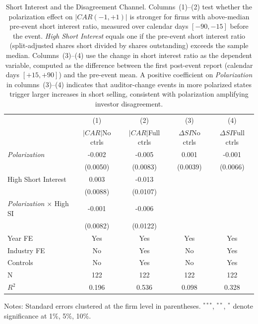 \begin{table}[htbp]
\centering
\caption{Short Interest and the Disagreement Channel. Columns~(1)--(2) test whether the polarization effect on $|CAR(-1,+1)|$ is stronger for firms with above-median pre-event short interest ratio, measured over calendar days $[-90,-15]$ before the event. \textit{High Short Interest} equals one if the pre-event short interest ratio (split-adjusted shares short divided by shares outstanding) exceeds the sample median. Columns~(3)--(4) use the change in short interest ratio as the dependent variable, computed as the difference between the first post-event report (calendar days $[+15,+90]$) and the pre-event mean. A positive coefficient on \textit{Polarization} in columns~(3)--(4) indicates that auditor-change events in more polarized states trigger larger increases in short selling, consistent with polarization amplifying investor disagreement.}
\label{tab:short_interest}
\begin{tabular}{lcccc}
\toprule
 & (1) & (2) & (3) & (4) \\
 & $|CAR|$\newline No ctrls & $|CAR|$\newline Full ctrls & $\Delta SI$\newline No ctrls & $\Delta SI$\newline Full ctrls \\
\midrule
\textit{Polarization} & -0.002 & -0.005 & 0.001 & -0.001 \\
 & (0.0050) & (0.0083) & (0.0039) & (0.0066) \\
High Short Interest & 0.003 & -0.013 &  &  \\
 & (0.0088) & (0.0107) &  &  \\
\textit{Polarization} $\times$ High SI & -0.001 & -0.006 &  &  \\
 & (0.0082) & (0.0122) &  &  \\
\midrule
Year FE & Yes & Yes & Yes & Yes \\
Industry FE & No & Yes & No & Yes \\
Controls & No & Yes & No & Yes \\
N & 122 & 122 & 122 & 122 \\
$R^2$ & 0.196 & 0.536 & 0.098 & 0.328 \\
\bottomrule
\end{tabular}
\begin{flushleft}
\footnotesize Notes: Standard errors clustered at the firm level in parentheses. $^{***}$, $^{**}$, $^{*}$ denote significance at 1\%, 5\%, 10\%.
\end{flushleft}
\end{table}
